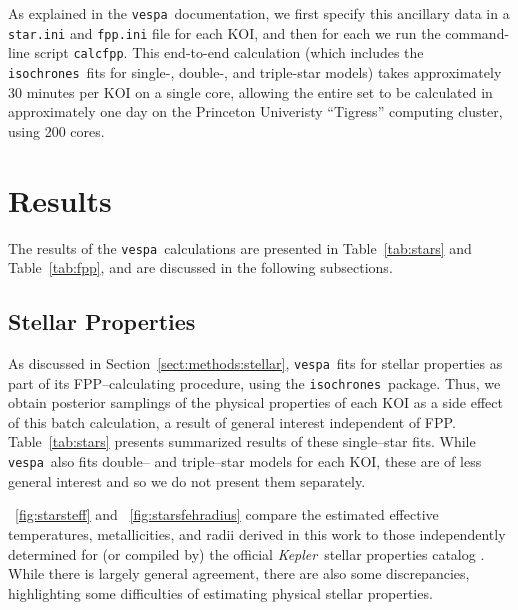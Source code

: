 \documentclass{emulateapj}
\newcommand{\figref}[1]{\ref{fig:#1}}
\newcommand{\Fig}[1]{\figurename~\figref{#1}}
\newcommand{\fig}[1]{\Fig{#1}}
\newcommand{\Tab}[1]{Table~\ref{tab:#1}}
\newcommand{\tab}[1]{\Tab{#1}}
\newcommand{\sectionname}{Section}
\newcommand{\Sect}[1]{\sectionname~\ref{sect:#1}}
\newcommand{\sect}[1]{\Sect{#1}}
\newcommand{\sectlabel}[1]{\label{sect:#1}}
\newcommand{\nattempted}{8141}
\newcommand{\ntryfail}{112}
\newcommand{\kepler}{\textit{Kepler}}
\newcommand{\vespa}{\texttt{vespa}}
\newcommand{\isochrones}{\texttt{isochrones}}
\begin{document}
As explained in the \vespa\ documentation, we first specify this
ancillary data in a \verb|star.ini| and \verb|fpp.ini| file for each
KOI, and then for each we run the command-line script \verb|calcfpp|.
This end-to-end calculation (which includes the \isochrones\ fits for
single-, double-, and triple-star models) takes approximately 30
minutes per KOI on a single core, allowing the entire set to be
calculated in approximately one day on the Princeton Univeristy
``Tigress'' computing cluster, using 200 cores.




\section{Results}
\sectlabel{results}

The results of the \vespa\ calculations are presented in
\tab{stars} and \tab{fpp}, and are discussed in
the following subsections.  



\subsection{Stellar Properties}
\sectlabel{results:stars}

As discussed in \sect{methods:stellar}, \vespa\ fits for stellar
properties as part of its FPP--calculating procedure, using the
\isochrones\ package.  Thus, we obtain posterior samplings of the
physical properties of each KOI as a side effect of this batch
calculation, a result of general interest independent of FPP.
\tab{stars} presents summarized results of these single--star
fits.  While \vespa\ also fits double-- and triple--star models for
each KOI, these are of less general interest and so we do not
present them separately.

\fig{starsteff} and \fig{starsfehradius} compare the estimated
effective temperatures, metallicities, and radii derived in this work
to those independently determined for (or compiled by) the official
\kepler\ stellar properties catalog \citep[][hereafter
  ]{Huber:2014}.  While there is largely
general agreement, there are also some discrepancies, highlighting some
difficulties of estimating physical stellar properties.
\end{document}
